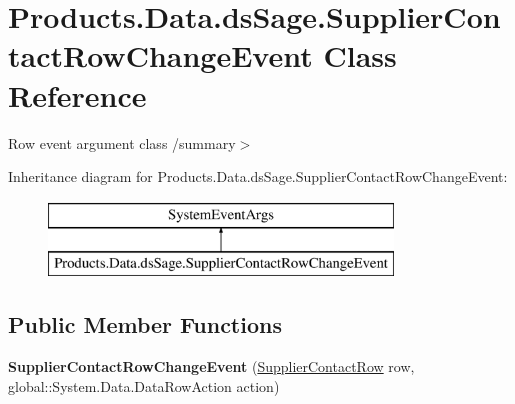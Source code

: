 \hypertarget{class_products_1_1_data_1_1ds_sage_1_1_supplier_contact_row_change_event}{}\section{Products.\+Data.\+ds\+Sage.\+Supplier\+Contact\+Row\+Change\+Event Class Reference}
\label{class_products_1_1_data_1_1ds_sage_1_1_supplier_contact_row_change_event}


Row event argument class /summary$>$  


Inheritance diagram for Products.\+Data.\+ds\+Sage.\+Supplier\+Contact\+Row\+Change\+Event\+:\begin{figure}[H]
\begin{center}
\leavevmode
\includegraphics[height=2.000000cm]{class_products_1_1_data_1_1ds_sage_1_1_supplier_contact_row_change_event}
\end{center}
\end{figure}
\subsection*{Public Member Functions}
\begin{DoxyCompactItemize}
\item 
{\bfseries Supplier\+Contact\+Row\+Change\+Event} (\hyperlink{class_products_1_1_data_1_1ds_sage_1_1_supplier_contact_row}{Supplier\+Contact\+Row} row, global\+::\+System.\+Data.\+Data\+Row\+Action action)\hypertarget{class_products_1_1_data_1_1ds_sage_1_1_supplier_contact_row_change_event_a0a1334fa17ea1b320ac1e41b7954ada1}{}\label{class_products_1_1_data_1_1ds_sage_1_1_supplier_contact_row_change_event_a0a1334fa17ea1b320ac1e41b7954ada1}

\end{DoxyCompactItemize}
